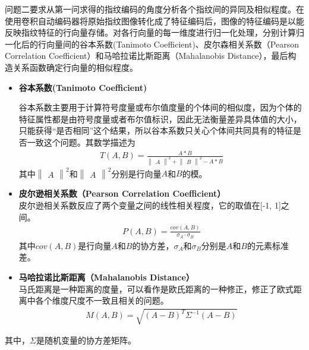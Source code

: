 \documentclass{whutmod}
\begin{document}
问题二要求从第一问求得的指纹编码的角度分析各个指纹间的异同及相似程度。在使用卷积自动编码器将原始指纹图像转化成了特征编码后，图像的特征编码是以能反映指纹特征的行向量存储。对各行向量的每一维度进行归一化处理，分别计算归一化后的行向量间的谷本系数(Tanimoto Coefficient)、皮尔森相关系数（Pearson Correlation Coefficient）和马哈拉诺比斯距离（Mahalanobis Distance），最后构造关系函数确定行向量的相似程度。
			
			
			\begin{itemize}
				\item \textbf{谷本系数(Tanimoto Coefficient)}
				
				谷本系数主要用于计算符号度量或布尔值度量的个体间的相似度，因为个体的特征属性都是由符号度量或者布尔值标识，因此无法衡量差异具体值的大小，只能获得“是否相同”这个结果，所以谷本系数只关心个体间共同具有的特征是否一致这个问题。其数学描述为
				\begin{gather}
				T(A,B)=\frac{A\ast B}{\begin{Vmatrix}
						A
					\end{Vmatrix}^2+\begin{Vmatrix}
						B
					\end{Vmatrix}^2-A\ast B}
				\end{gather}
				其中$\begin{Vmatrix}
				A
				\end{Vmatrix}^2$和$\begin{Vmatrix}
				A
				\end{Vmatrix}^2$分别是行向量$A$和$B$的模。
				\item \textbf{皮尔逊相关系数（Pearson Correlation Coefficient）}\\
				皮尔逊相关系数反应了两个变量之间的线性相关程度，它的取值在[-1, 1]之间。
				\begin{gather}
					P(A,B)=\frac{cov(A,B)}{\sigma_A\cdot \sigma_B}
				\end{gather}
				其中$cov(A,B)$是行向量$A$和$B$的协方差，$\sigma_A$和$\sigma_B$分别是$A$和$B$的元素标准差。
				\item \textbf{马哈拉诺比斯距离（Mahalanobis Distance）}\\
				马氏距离是一种距离的度量，可以看作是欧氏距离的一种修正，修正了欧式距离中各个维度尺度不一致且相关的问题。
				\begin{gather}
				M(A,B)=\sqrt{(A-B)^T\Sigma^{-1}(A-B)}
				\end{gather}
			\end{itemize}
			其中，$\Sigma$是随机变量的协方差矩阵。
			
\end{document}
